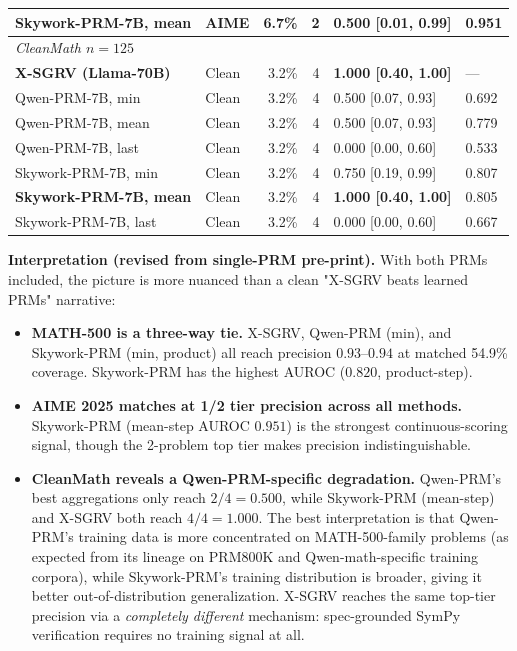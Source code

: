 \documentclass{article}
\begin{document}
\begin{table}[t]
\begin{tabular}{llrrll}
Skywork-PRM-7B, mean                        & AIME &  6.7\% &  2 & 0.500 [0.01, 0.99] & \textbf{0.951} \\
\midrule
\multicolumn{6}{l}{\emph{CleanMath $n{=}125$}}\\
\textbf{X-SGRV (Llama-70B)}                & Clean &  3.2\% &  4 & \textbf{1.000 [0.40, 1.00]} & --- \\
Qwen-PRM-7B, min                            & Clean &  3.2\% &  4 & 0.500 [0.07, 0.93] & 0.692 \\
Qwen-PRM-7B, mean                           & Clean &  3.2\% &  4 & 0.500 [0.07, 0.93] & 0.779 \\
Qwen-PRM-7B, last                           & Clean &  3.2\% &  4 & 0.000 [0.00, 0.60] & 0.533 \\
Skywork-PRM-7B, min                         & Clean &  3.2\% &  4 & 0.750 [0.19, 0.99] & 0.807 \\
\textbf{Skywork-PRM-7B, mean}               & Clean &  3.2\% &  4 & \textbf{1.000 [0.40, 1.00]} & 0.805 \\
Skywork-PRM-7B, last                        & Clean &  3.2\% &  4 & 0.000 [0.00, 0.60] & 0.667 \\
\bottomrule
\end{tabular}
\end{table}

\textbf{Interpretation (revised from single-PRM pre-print).} With both PRMs included, the picture is more nuanced than a clean "X-SGRV beats learned PRMs" narrative:
\begin{itemize}[leftmargin=*,itemsep=1pt]
\item \textbf{MATH-500 is a three-way tie.} X-SGRV, Qwen-PRM (min), and Skywork-PRM (min, product) all reach precision $0.93$--$0.94$ at matched 54.9\% coverage. Skywork-PRM has the highest AUROC ($0.820$, product-step).
\item \textbf{AIME 2025 matches at 1/2 tier precision across all methods.} Skywork-PRM (mean-step AUROC $0.951$) is the strongest continuous-scoring signal, though the 2-problem top tier makes precision indistinguishable.
\item \textbf{CleanMath reveals a Qwen-PRM-specific degradation.} Qwen-PRM's best aggregations only reach $2/4 = 0.500$, while Skywork-PRM (mean-step) and X-SGRV both reach $4/4 = 1.000$. The best interpretation is that Qwen-PRM's training data is more concentrated on MATH-500-family problems (as expected from its lineage on PRM800K and Qwen-math-specific training corpora), while Skywork-PRM's training distribution is broader, giving it better out-of-distribution generalization. X-SGRV reaches the same top-tier precision via a \emph{completely different} mechanism: spec-grounded SymPy verification requires no training signal at all.
\end{itemize}
\end{document}
